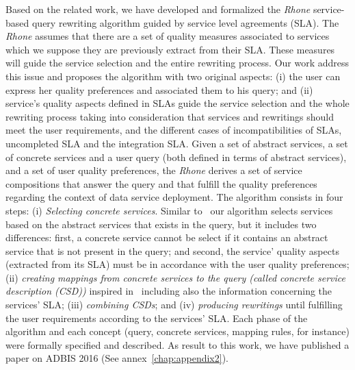 Based on the related work, we have developed and formalized the \textit{Rhone} service-based query rewriting algorithm guided by service level agreements (SLA). The \textit{Rhone} assumes that there are a set of quality measures associated to services which we suppose they are previously extract from their SLA. These measures will guide the service selection and the entire rewriting process.  Our work address this issue and proposes the algorithm with two original aspects: (i) the user can express her quality preferences and associated them to his query; and (ii) service's quality aspects defined in SLAs guide the service selection and the whole rewriting process taking into consideration that services and rewritings should meet the user requirements, and the different cases of incompatibilities of SLAs, uncompleted SLA and the integration SLA. 
Given a set of abstract services, a set of concrete services and a user query (both defined in terms of abstract services), and a set of user quality preferences, the \textit{Rhone} derives a set of service compositions that answer the query and that fulfill the quality preferences regarding the context of data service deployment. The algorithm consists in four steps: (i) \textit{Selecting concrete services}. Similar to~\cite{Levy:1996,Pottinger:2001} our algorithm selects services based on the abstract services that exists in the query, but it includes two differences: first, a concrete service cannot be select if it contains an abstract service that is not present in the query; and second, the service' quality aspects (extracted from its SLA) must be in accordance with the user quality preferences; (ii) \textit{creating mappings from concrete services to the query (called concrete service description (CSD))} inspired in~\cite{Pottinger:2001} including also the information concerning the services' SLA; (iii) \textit{combining CSDs}; and (iv) \textit{producing rewritings} until fulfilling the user requirements according to the services' SLA. Each phase of the algorithm and each concept (query, concrete services, mapping rules, for instance) were formally specified and described. As result to this work, we have published a paper on ADBIS 2016 (See annex~\ref{chap:appendix2}).


